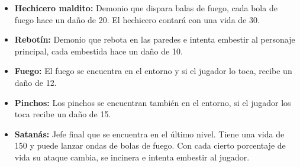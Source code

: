 \documentclass{article}
\begin{document}
\begin{itemize}
\item{\textbf{Hechicero maldito:} }   Demonio que dispara balas de fuego, cada bola de fuego hace un daño de 20. El hechicero contará con una vida de 30.
\end{itemize} 
\begin{itemize}
    \item {\textbf{Rebotín:}} Demonio que rebota en las paredes e intenta embestir al personaje principal, cada embestida hace un daño de 10. 
\end{itemize}
\begin{itemize}
    \item {\textbf{Fuego:}} El fuego se encuentra en el entorno y si el jugador lo toca, recibe un daño de 12.
\end{itemize}
\begin{itemize}
    \item {\textbf{Pinchos:}} Los pinchos se encuentran también en el entorno, si el jugador los toca recibe un daño de 15.
\end{itemize}
\begin{itemize}
    \item {\textbf{Satanás:}} Jefe final que se encuentra en el último nivel. Tiene una vida de 150 y puede lanzar ondas de bolas de fuego. Con cada cierto porcentaje de vida su ataque cambia, se incinera e intenta embestir al jugador.
\end{itemize}
\end{document}

